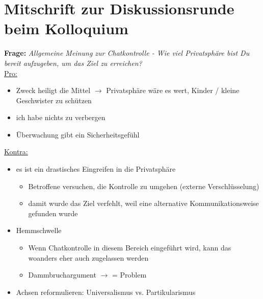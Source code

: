 \appendix
\chapter{Mitschrift zur Diskussionsrunde beim Kolloquium}
\label{MitschriftKolloquium}

\noindent \textbf{Frage:} \textit{Allgemeine Meinung zur Chatkontrolle - Wie viel Privatsphäre bist Du bereit aufzugeben, um das Ziel zu erreichen?}\\
\underline{Pro:}
\begin{itemize}
    \item Zweck heiligt die Mittel $\rightarrow$ Privatsphäre wäre es wert, Kinder / kleine Geschwister zu schützen
    \item \glqq ich habe nichts zu verbergen\grqq{}
    \item Überwachung gibt ein Sicherheitsgefühl
\end{itemize}
\underline{Kontra:}
\begin{itemize}
    \item es ist ein drastisches Eingreifen in die Privatsphäre
    \begin{itemize}
        \item Betroffene versuchen, die Kontrolle zu umgehen (externe Verschlüsselung)
        \item damit wurde das Ziel verfehlt, weil eine alternative Kommunikationsweise gefunden wurde
    \end{itemize}
    \item Hemmschwelle
    \begin{itemize}
        \item Wenn Chatkontrolle in diesem Bereich eingeführt wird, kann das woanders eher auch zugelassen werden
        \item Dammbruchargument $\rightarrow$ = Problem
    \end{itemize}
    \item Achsen reformulieren: Universalismus vs. Partikularismus
\end{itemize}



